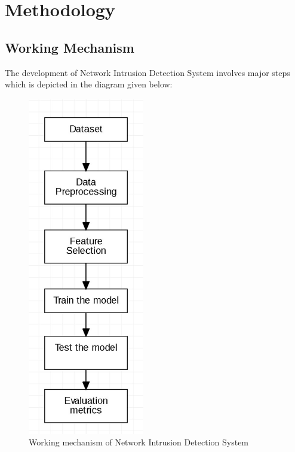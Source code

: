 \chapter{Methodology}
\vspace{-18pt}
  \section{Working Mechanism}
  \vspace{-18pt}
The development of Network Intrusion Detection System involves major steps which is 
depicted in the diagram given below:
\begin{figure}[tbh] %
\begin{center}
	\includegraphics[width=2in]{images/wm2.jpg} 
	\caption{Working mechanism of Network Intrusion Detection System} %
	\label{Working mechanism of Network Intrusion Detection System} %
\end{center}
\end{figure}
\newpage
